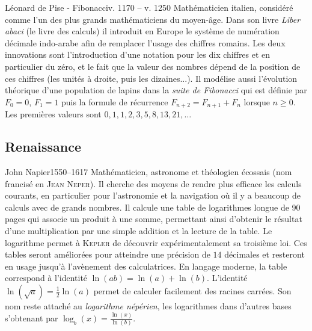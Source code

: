 \documentclass[10pt,class=article,crop=false]{standalone}
\begin{document}
\begin{multicols}{2}
\begin{biographie}{Léonard de Pise - Fibonacci}{v. 1170 -- v. 1250}
Mathématicien italien, considéré comme l'un des plus grands mathématiciens du moyen-âge.
Dans son livre \emph{Liber abaci} (le livre des calculs) il introduit en Europe le système de numération décimale indo-arabe afin de remplacer l'usage des chiffres romains. Les deux innovations sont l'introduction d'une notation pour les dix chiffres et en particulier du zéro, et le fait que la valeur des nombres dépend de la position de ces chiffres (les unités à droite, puis les dizaines...).
Il modélise aussi l’évolution théorique d’une population de lapins dans 
la \emph{suite de Fibonacci} qui est définie par $F_0=0$, $F_1=1$ puis la formule de récurrence 
$F_{n+2} = F_{n+1} + F_n$ lorsque $n \ge 0$. Les premières valeurs sont $0,1,1,2,3,5,8,13,21,\ldots$
\end{biographie}


\subsection{Renaissance}

\begin{biographie}{John Napier}{1550--1617}
Mathématicien, astronome et théologien écossais (nom francisé en \textsc{Jean Neper}).
Il cherche des moyens de rendre plus efficace les calculs courants, en particulier pour l'astronomie et la navigation où il y a beaucoup de calculs avec de grands nombres.
Il calcule une table de logarithmes longue de 90 pages qui associe un produit à une somme, permettant ainsi d'obtenir le résultat d'une multiplication par une simple addition et la lecture de la table. 
Le logarithme permet à \textsc{Kepler} de découvrir expérimentalement sa troisième loi. Ces tables seront améliorées pour atteindre une précision de $14$ décimales et resteront en usage jusqu'à l'avènement des calculatrices. En langage moderne, la table correspond à l'identité $\ln(ab) = \ln(a) + \ln(b)$. L'identité $\ln(\sqrt{a}) = \frac12\ln(a)$ permet de calculer facilement des racines carrées. 
 Son nom reste attaché au \emph{logarithme népérien}, les logarithmes dans d'autres bases s'obtenant par $\log_b(x) = \frac{\ln(x)}{\ln(b)}$.
\end{biographie}



\end{multicols}
\end{document}
